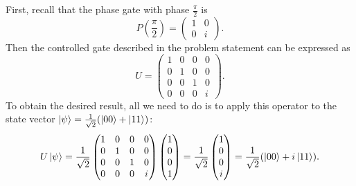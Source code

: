 \documentclass[11pt]{article}
\newcommand{\invroot}[1]{\frac{1}{\sqrt{#1}}}
\begin{document}
First, recall that the phase gate with phase \(\frac{\pi}{2}\) is
\begin{equation}
P\left(\frac{\pi}{2}\right)=
  \begin{pmatrix}
    1 & 0\\
    0 & i
  \end{pmatrix}.
\end{equation}
Then the controlled gate described in the problem statement can be expressed as
\begin{equation}
U=\begin{pmatrix}
    1 & 0 & 0 & 0\\
    0 & 1 & 0 & 0\\
    0 & 0 & 1 & 0\\
    0 & 0 & 0 & i
  \end{pmatrix}.
\end{equation}
To obtain the desired result, all we need to do is to apply this operator to the
state vector \(\ket{\psi}=\invroot{2}(\ket{00}+\ket{11})\):
\begin{equation}
U\ket{\psi}=\invroot{2}
  \begin{pmatrix}
    1 & 0 & 0 & 0\\
    0 & 1 & 0 & 0\\
    0 & 0 & 1 & 0\\
    0 & 0 & 0 & i
  \end{pmatrix}
  \begin{pmatrix}
    1\\
    0\\
    0\\
    1
  \end{pmatrix}=\invroot{2}
  \begin{pmatrix}
    1\\
    0\\
    0\\
    i
  \end{pmatrix}=\invroot{2}(\ket{00}+i\ket{11}).
\end{equation}
\end{document}

